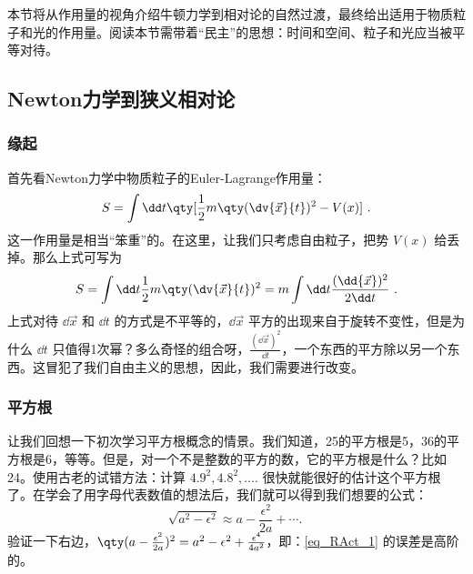 本节将从作用量的视角介绍牛顿力学到相对论的自然过渡，最终给出适用于物质粒子和光的作用量。阅读本节需带着“民主”的思想：时间和空间、粒子和光应当被平等对待。
\subsection{Newton力学到狭义相对论}
\subsubsection{缘起}
首先看Newton力学中物质粒子的Euler-Lagrange作用量：
\begin{equation}\label{eq_RAct_5}
S=\int\dd t\qty[\frac{1}{2}m\qty(\dv{\vec x}{t})^2-V(x)]~.
\end{equation}
这一作用量是相当“笨重”的。在这里，让我们只考虑自由粒子，把势 $V(x)$ 给丢掉。那么上式可写为
\begin{equation}\label{eq_RAct_2}
S=\int\dd t\frac{1}{2}m\qty(\dv{\vec x}{t})^2=m\int\dd t\frac{(\dd{\vec x})^2}{2\dd t}~.
\end{equation}
上式对待 $\dd{\vec x}$ 和 $\dd t$ 的方式是不平等的，$\dd{\vec x}$ 平方的出现来自于旋转不变性，但是为什么 $\dd t$ 只值得1次幂？多么奇怪的组合呀，$\frac{(\dd{\vec x})^2}{\dd t}$，一个东西的平方除以另一个东西。这冒犯了我们自由主义的思想，因此，我们需要进行改变。

\subsubsection{平方根}
让我们回想一下初次学习平方根概念的情景。我们知道，25的平方根是5，36的平方根是6，等等。但是，对一个不是整数的平方的数，它的平方根是什么？比如24。使用古老的试错方法：计算 $4.9^2,4.8^2,\ldots.$ 很快就能很好的估计这个平方根了。在学会了用字母代表数值的想法后，我们就可以得到我们想要的公式：
\begin{equation}\label{eq_RAct_1}
\sqrt{a^2-\epsilon^2}\approx a-\frac{\epsilon^2}{2a}+\cdots.~
\end{equation}
验证一下右边，$\qty(a-\frac{\epsilon^2}{2a})^2=a^2-\epsilon^2+\frac{\epsilon^4}{4a^2}$，即：\autoref{eq_RAct_1} 的误差是高阶的。

